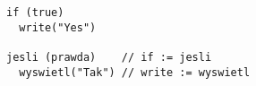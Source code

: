 \vspace{-2.25em}
\begin{center}
\begin{minipage}[t]{1\textwidth}
\begin{listing}[H]
\begin{spacing}{0.6}
\begin{verbatim}
if (true)
  write("Yes")

jesli (prawda)    // if := jesli
  wyswietl("Tak") // write := wyswietl
\end{verbatim}
\end{spacing}
\end{listing}
\end{minipage}
\end{center}
